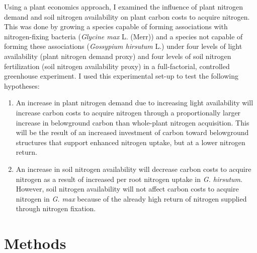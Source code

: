 Using a plant economics approach, I examined the influence of plant nitrogen demand and soil nitrogen availability on plant carbon costs to acquire nitrogen. This was done by growing a species capable of forming associations with nitrogen-fixing bacteria (\textit{Glycine max} L. (Merr)) and a species not capable of forming these associations (\textit{Gossypium hirsutum} L.) under four levels of light availability (plant nitrogen demand proxy) and four levels of soil nitrogen fertilization (soil nitrogen availability proxy) in a full-factorial, controlled greenhouse experiment. I used this experimental set-up to test the following hypotheses:
\begin{enumerate}
\item An increase in plant nitrogen demand due to increasing light availability will increase carbon costs to acquire nitrogen through a proportionally larger increase in belowground carbon than whole-plant nitrogen acquisition. This will be the result of an increased investment of carbon toward belowground structures that support enhanced nitrogen uptake, but at a lower nitrogen return. 

\item An increase in soil nitrogen availability will decrease carbon costs to acquire nitrogen as a result of increased per root nitrogen uptake in \textit{G. hirsutum}. However, soil nitrogen availability will not affect carbon costs to acquire nitrogen in \textit{G. max} because of the already high return of nitrogen supplied through nitrogen fixation.
\end{enumerate}

\section{Methods}
